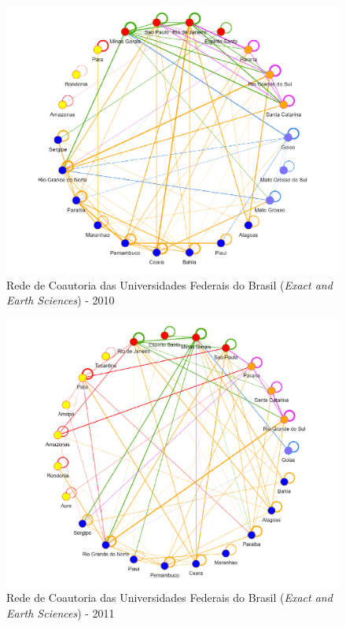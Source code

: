 \begin{figure}[H]
	\centering
	\includegraphics[scale=0.6]{Imagens/rede-exact-br-2010.pdf}
	\caption{Rede de Coautoria das Universidades Federais do Brasil (\textit{Exact and Earth Sciences}) - 2010}
	\label{Rede de Coautoria - UF EXACT BR 2010}
\end{figure}

\begin{figure}[H]
	\centering
	\includegraphics[scale=0.6]{Imagens/rede-exact-br-2011.pdf}
	\caption{Rede de Coautoria das Universidades Federais do Brasil (\textit{Exact and Earth Sciences}) - 2011}
	\label{Rede de Coautoria - UF EXACT BR 2011}
\end{figure}


